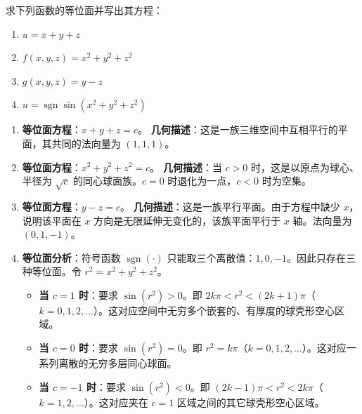 \documentclass[lang=cn,11pt]{elegantbook}
\begin{document}
\begin{exercise}[求解等位面]
求下列函数的等位面并写出其方程：
\begin{enumerate}
  \item[(1)] $u = x+y+z$
  \item[(2)] $f(x,y,z) = x^2+y^2+z^2$
  \item[(3)] $g(x,y,z) = y-z$
  \item[(4)] $u = \operatorname{sgn}\sin(x^2+y^2+z^2)$
\end{enumerate}
\end{exercise}
\begin{solution}
\begin{enumerate}
  \item[(1)] \textbf{等位面方程}：$x+y+z=c$。
  \textbf{几何描述}：这是一族三维空间中互相平行的平面，其共同的法向量为 $(1,1,1)$。
  \item[(2)] \textbf{等位面方程}：$x^2+y^2+z^2=c$。
  \textbf{几何描述}：当 $c>0$ 时，这是以原点为球心、半径为 $\sqrt{c}$ 的同心球面族。$c=0$ 时退化为一点，$c<0$ 时为空集。
  \item[(3)] \textbf{等位面方程}：$y-z=c$。
  \textbf{几何描述}：这是一族平行平面。由于方程中缺少 $x$，说明该平面在 $x$ 方向是无限延伸无变化的，该族平面平行于 $x$ 轴。法向量为 $(0,1,-1)$。
  \item[(4)] \textbf{等位面分析}：符号函数 $\operatorname{sgn}(\cdot)$ 只能取三个离散值：$1, 0, -1$。因此只存在三种等位面。令 $r^2 = x^2+y^2+z^2$。
  \begin{itemize}
    \item \textbf{当 $c=1$ 时}：要求 $\sin(r^2) > 0$。即 $2k\pi < r^2 < (2k+1)\pi$（$k=0,1,2,\dots$）。这对应空间中无穷多个嵌套的、有厚度的球壳形空心区域。
    \item \textbf{当 $c=0$ 时}：要求 $\sin(r^2) = 0$。即 $r^2 = k\pi$（$k=0,1,2,\dots$）。这对应一系列离散的无穷多层同心球面。
    \item \textbf{当 $c=-1$ 时}：要求 $\sin(r^2) < 0$。即 $(2k-1)\pi < r^2 < 2k\pi$（$k=1,2,\dots$）。这对应夹在 $c=1$ 区域之间的其它球壳形空心区域。
  \end{itemize}
\end{enumerate}
\end{solution}
\end{document}

